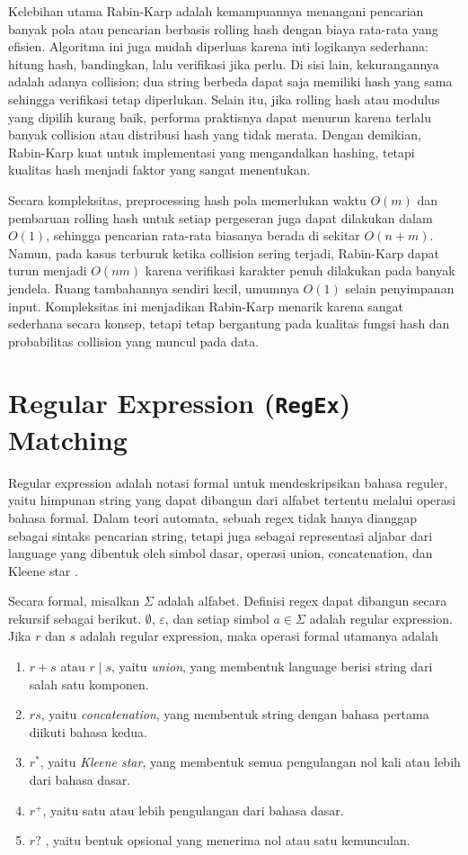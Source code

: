 Kelebihan utama Rabin-Karp adalah kemampuannya menangani pencarian banyak pola atau pencarian berbasis rolling hash dengan biaya rata-rata yang efisien. Algoritma ini juga mudah diperluas karena inti logikanya sederhana: hitung hash, bandingkan, lalu verifikasi jika perlu. Di sisi lain, kekurangannya adalah adanya collision; dua string berbeda dapat saja memiliki hash yang sama sehingga verifikasi tetap diperlukan. Selain itu, jika rolling hash atau modulus yang dipilih kurang baik, performa praktisnya dapat menurun karena terlalu banyak collision atau distribusi hash yang tidak merata. Dengan demikian, Rabin-Karp kuat untuk implementasi yang mengandalkan hashing, tetapi kualitas hash menjadi faktor yang sangat menentukan.

Secara kompleksitas, preprocessing hash pola memerlukan waktu $O(m)$ dan pembaruan rolling hash untuk setiap pergeseran juga dapat dilakukan dalam $O(1)$, sehingga pencarian rata-rata biasanya berada di sekitar $O(n + m)$. Namun, pada kasus terburuk ketika collision sering terjadi, Rabin-Karp dapat turun menjadi $O(nm)$ karena verifikasi karakter penuh dilakukan pada banyak jendela. Ruang tambahannya sendiri kecil, umumnya $O(1)$ selain penyimpanan input. Kompleksitas ini menjadikan Rabin-Karp menarik karena sangat sederhana secara konsep, tetapi tetap bergantung pada kualitas fungsi hash dan probabilitas collision yang muncul pada data.

\section{Regular Expression (\texttt{RegEx}) Matching}

Regular expression adalah notasi formal untuk mendeskripsikan bahasa reguler, yaitu himpunan string yang dapat dibangun dari alfabet tertentu melalui operasi bahasa formal. Dalam teori automata, sebuah regex tidak hanya dianggap sebagai sintaks pencarian string, tetapi juga sebagai representasi aljabar dari language yang dibentuk oleh simbol dasar, operasi union, concatenation, dan Kleene star \cite{hopcroft2006automata}.

Secara formal, misalkan $\Sigma$ adalah alfabet. Definisi regex dapat dibangun secara rekursif sebagai berikut. $\emptyset$, $\varepsilon$, dan setiap simbol $a \in \Sigma$ adalah regular expression. Jika $r$ dan $s$ adalah regular expression, maka operasi formal utamanya adalah

\begin{enumerate}
    \item $r + s$ atau $r \mid s$, yaitu \textit{union}, yang membentuk language berisi string dari salah satu komponen.
    \item $rs$, yaitu \textit{concatenation}, yang membentuk string dengan bahasa pertama diikuti bahasa kedua.
    \item $r^*$, yaitu \textit{Kleene star}, yang membentuk semua pengulangan nol kali atau lebih dari bahasa dasar.
    \item $r^+$, yaitu satu atau lebih pengulangan dari bahasa dasar.
    \item $r?$ , yaitu bentuk opsional yang menerima nol atau satu kemunculan.
\end{enumerate}

